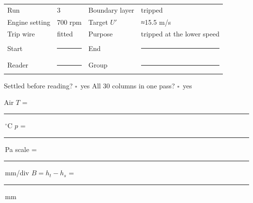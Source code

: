 \documentclass[10pt,a4paper]{article}
\newcommand{\blank}{\rule{1.55cm}{0.4pt}}
\newcommand{\checkbox}{\ensuremath{\square}}
\begin{document}
\begin{tabularx}{\textwidth}{@{}p{3.1cm}p{2.7cm}p{3.0cm}X@{}}
\toprule
Run & 3 & Boundary layer & tripped \\
Engine setting & 700 rpm & Target $U'$ & ≈15.5 m/s \\
Trip wire & fitted & Purpose & tripped at the lower speed \\
Start & \blank & End & \blank \\
Reader & \blank & Group & \blank \\
\bottomrule
\end{tabularx}

{\small Settled before reading? \checkbox\ yes \qquad All 30 columns in one pass? \checkbox\ yes\par
Air $T$ = \blank\,$^\circ$C \qquad $p$ = \blank\,Pa \qquad
scale = \blank\,mm/div \qquad $B=h_t-h_s$ = \blank\,mm}
\end{document}
